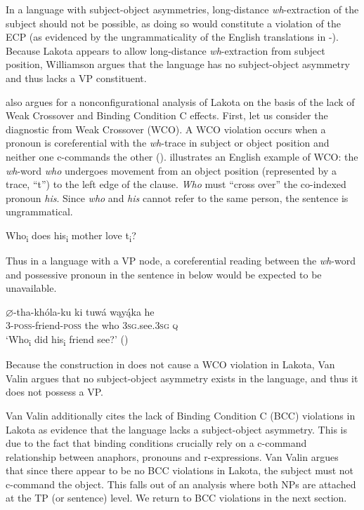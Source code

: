 \documentclass[output=paper]{LSP/langsci}
\begin{document}
In a language with subject-object asymmetries, long-distance \textit{wh}-extraction of the subject should not be possible, as doing so would constitute a violation of the ECP (as evidenced by the ungrammaticality of the English translations in -).  Because Lakota appears to allow long-distance \textit{wh}-extraction from subject position, Williamson argues that the language has no subject-object asymmetry and thus lacks a VP constituent.

\citet{VanValin1985,VanValin1987} also argues for a nonconfigurational analysis of Lakota on the basis of the lack of Weak Crossover and Binding Condition C effects.  First, let us consider the diagnostic from Weak Crossover (WCO). A WCO violation occurs when a pronoun is coreferential with the \textit{wh}-trace in subject or object position and neither one c-commands the other (\citealt{Sportiche1985}).   illustrates an English example of WCO: the \textit{wh}-word \textit{who} undergoes movement from an object position (represented by a trace, ``t'') to the left edge of the clause. \textit{Who} must ``cross over'' the co-indexed pronoun \textit{his}. Since \textit{who} and \textit{his} cannot refer to the same person, the sentence is ungrammatical. 

\begin{exe}
\ex  *Who\textsubscript{i} does his\textsubscript{i} mother love t\textsubscript{i}?
\end{exe}

Thus in a language with a VP node, a coreferential reading between the \textit{wh}-word and possessive pronoun in the sentence in  below would be expected to be unavailable.

\begin{exe}
\ex \gll $\varnothing$-tha-kh\'ola-ku 	ki	tuw\'a	wąy\k{\'a}ka	he \\
3-\textsc{poss}-friend-\textsc{poss} the who		\textsc{3sg}.see.\textsc{3sg} 	\textsc{q} \\
\trans `Who\textsubscript{i} did his\textsubscript{i}  friend see?' (\citealt[379]{VanValin1987})
\end{exe}

Because the construction in  does not cause a WCO violation in Lakota, Van Valin argues that no subject-object asymmetry exists in the language, and thus it does not possess a VP.
	
Van Valin additionally cites the lack of Binding Condition C (BCC) violations in Lakota as evidence that the language lacks a subject-object asymmetry.  This is due to the fact that binding conditions crucially rely on a c-command relationship between anaphors, pronouns and r-expressions.  Van Valin argues that since there appear to be no BCC violations in Lakota, the subject must not c-command the object. This falls out of an analysis where both NPs are attached at the TP (or sentence) level. We return to BCC violations in the next section.
\end{document}
